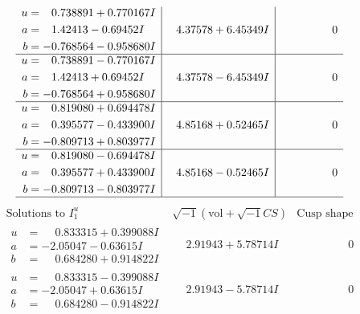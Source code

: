 \documentclass[1p]{elsarticle_modified}
\theoremstyle{definition}
\newcommand{\I}{\sqrt{-1}}
\begin{document}
$$\begin{array}{c|c|c}
\begin{aligned}
u &= \phantom{-}0.738891 + 0.770167 I \\
a &= \phantom{-}1.42413 - 0.69452 I \\
b &= -0.768564 - 0.958680 I\end{aligned}
 & \phantom{-}4.37578 + 6.45349 I & \phantom{-0.000000 } 0 \\ \hline\begin{aligned}
u &= \phantom{-}0.738891 - 0.770167 I \\
a &= \phantom{-}1.42413 + 0.69452 I \\
b &= -0.768564 + 0.958680 I\end{aligned}
 & \phantom{-}4.37578 - 6.45349 I & \phantom{-0.000000 } 0 \\ \hline\begin{aligned}
u &= \phantom{-}0.819080 + 0.694478 I \\
a &= \phantom{-}0.395577 - 0.433900 I \\
b &= -0.809713 + 0.803977 I\end{aligned}
 & \phantom{-}4.85168 + 0.52465 I & \phantom{-0.000000 } 0 \\ \hline\begin{aligned}
u &= \phantom{-}0.819080 - 0.694478 I \\
a &= \phantom{-}0.395577 + 0.433900 I \\
b &= -0.809713 - 0.803977 I\end{aligned}
 & \phantom{-}4.85168 - 0.52465 I & \phantom{-0.000000 } 0\\
 \hline 
 \end{array}$$\newpage$$\begin{array}{c|c|c}  
\text{Solutions to }I^u_{1}& \I (\text{vol} + \sqrt{-1}CS) & \text{Cusp shape}\\
 \hline 
\begin{aligned}
u &= \phantom{-}0.833315 + 0.399088 I \\
a &= -2.05047 - 0.63615 I \\
b &= \phantom{-}0.684280 + 0.914822 I\end{aligned}
 & \phantom{-}2.91943 + 5.78714 I & \phantom{-0.000000 } 0 \\ \hline\begin{aligned}
u &= \phantom{-}0.833315 - 0.399088 I \\
a &= -2.05047 + 0.63615 I \\
b &= \phantom{-}0.684280 - 0.914822 I\end{aligned}
 & \phantom{-}2.91943 - 5.78714 I & \phantom{-0.000000 } 0 \\ \hline\begin{aligned}

\end{aligned}
\end{array}$$
\end{document}
